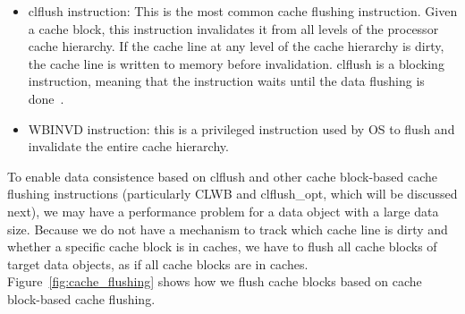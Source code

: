 \begin{comment}
How to flush memory; clflush vs. clwb; flushing the whole cache line vs. others\\

"use either pmem\_persist() or msync(2) when it needs to flush changes, depending on whether the memory pool appears to be persistent memory or a regular file (see the pmem\_is\_pmem() function in libpmem(3) for more information). " %
\end{comment}

\vspace{-5pt}
\begin{itemize}
\item {\selectfont clflush} instruction: 
This is the most common cache flushing instruction. 
Given a cache block, this instruction invalidates it from all levels of the processor cache hierarchy. If the cache line at any level of the cache hierarchy is dirty, the cache line is written to memory before invalidation. 
{\selectfont clflush} is a blocking instruction, meaning that the instruction waits until the data flushing is done~\cite{nvmsummit16:rudoff}. 

\item {\selectfont WBINVD} instruction: this is a privileged instruction used by OS to flush and invalidate the entire cache hierarchy.

\end{itemize}

To enable data consistence based on {\selectfont clflush} and other cache block-based cache flushing instructions (particularly {\selectfont CLWB} and {\selectfont clflush\_opt}, which will be discussed next),
we may have a performance problem 
for a data object with a large data size.  
Because we do not have a mechanism to track which cache line is dirty and whether a specific cache block is in caches, we have to flush all cache blocks of target data objects, as if all cache blocks are in caches. Figure~\ref{fig:cache_flushing} shows how we flush cache blocks based on cache block-based cache flushing. 

